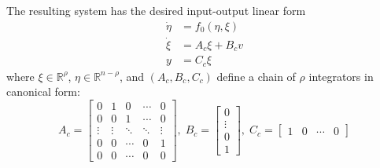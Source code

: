\newpar{}

The resulting system has the desired input-output linear form
\begin{align*}
    \dot{\eta} & = f_0(\eta, \xi)  \\
    \dot{\xi}  & = A_c \xi + B_c v \\
    y          & = C_c \xi
\end{align*}
where $\xi \in \mathbb{R}^\rho$, $\eta \in \mathbb{R}^{n - \rho}$, and $(A_c, B_c, C_c)$ define a chain of $\rho$ integrators in canonical form:
{\small
\begin{equation*}
    A_c =
    \begin{bmatrix}
        0      & 1      & 0      & \cdots & 0      \\
        0      & 0      & 1      & \cdots & 0      \\
        \vdots & \vdots & \ddots & \ddots & \vdots \\
        0      & 0      & \cdots & 0      & 1      \\
        0      & 0      & \cdots & 0      & 0
    \end{bmatrix},
    \;
    B_c =
    \begin{bmatrix}
        0      \\
        \vdots \\
        0      \\
        1
    \end{bmatrix},
    \;
    C_c = \begin{bmatrix}
        1 & 0 & \cdots & 0
    \end{bmatrix}
\end{equation*}
}

